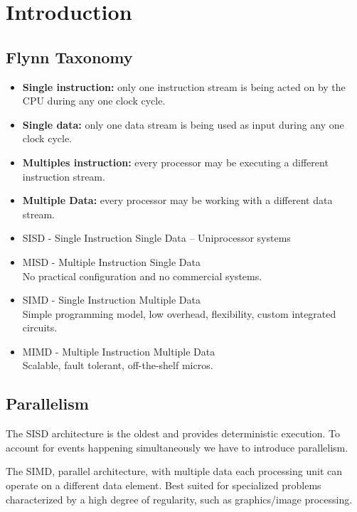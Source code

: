 


\section{Introduction}\label{sec:introduction}


\subsection{Flynn Taxonomy}\label{subsec:taxonomy}
\begin{itemize}
    \item[] \textbf{Single instruction:} only one instruction stream is being acted on by the CPU during any one clock
    cycle.
    \item[] \textbf{Single data:} only one data stream is being used as input during any one clock cycle.
    \item[] \textbf{Multiples instruction:} every processor may be executing a different instruction stream.
    \item[] \textbf{Multiple Data:} every processor may be working with a different data stream.
\end{itemize}


\begin{itemize}
    \item SISD - Single Instruction Single Data – Uniprocessor systems
    \item MISD - Multiple Instruction Single Data\\
    No practical configuration and no commercial systems.
    \item SIMD - Single Instruction Multiple Data\\
    Simple programming model, low overhead, flexibility, custom integrated circuits.
    \item MIMD - Multiple Instruction Multiple Data\\
    Scalable, fault tolerant, off-the-shelf micros.
\end{itemize}

\subsection{Parallelism}\label{subsec:parallelism}
The SISD architecture is the oldest and provides deterministic execution.
To account for events happening simultaneously we have to introduce parallelism.

The SIMD, parallel architecture, with multiple data each processing unit can operate on a different data element.
Best suited for specialized problems characterized by a high degree of regularity, such as graphics/image processing.


